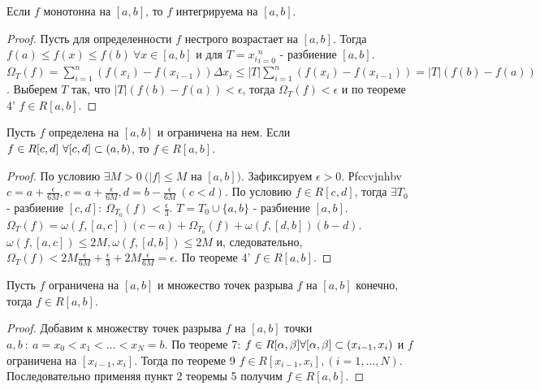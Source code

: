 \begin{theorem}
    Если $f$ монотонна на $[a, b]$, то $f$ интегрируема на $[a, b]$.
\end{theorem}

\begin{proof}
    Пусть для определенности $f$ нестрого возрастает на $[a, b]$. Тогда $f(a) \leq f(x) \leq f(b) \ \forall x \in [a, b]$ и для $T = {x_i}_{i = 0}^n$ - разбиение $[a, b]$.
    $\Omega_T (f) = \sum_{i = 1}^n(f(x_i) - f(x_{i-1}))\Delta x_i \leq |T|\sum_{i = 1}^n(f(x_i) - f(x_{i-1}))
    = |T|(f(b) - f(a))$.
    Выберем $T$ так, что $|T| (f(b) - f(a)) < \epsilon$, тогда $\Omega_T(f) < \epsilon$ и по теореме 4'
    $f \in R[a, b]$.
\end{proof}

\begin{theorem}
    Пусть $f$ определена на $[a, b]$ и ограничена на нем.
    Если $f \in R[c, d] \ \forall [c, d] \sub (a, b)$, то $f \in R[a, b]$.
\end{theorem}

\begin{proof}
    По условию $\exists M > 0 \ (|f| \leq M $ на $[a, b])$.
    Зафиксируем $\epsilon > 0$. Рfccvjnhbv $c = a + \frac{\epsilon}{6M},
    c = a + \frac{\epsilon}{6M}, d = b - \frac{\epsilon}{6M} \ (c < d)$.
    По условию $f \in R[c, d]$, тогда $\exists T_0$ - разбиение
    $[c, d] : \ \Omega_{T_0}(f) < \frac{\epsilon}{3}$.
    $T = T_0 \cup \{a, b\}$ - разбиение $[a, b]$.
    $\Omega_T(f) = \omega(f, [a, c])(c - a) + \Omega_{T_0}(f) + \omega(f, [d, b])(b - d)$.
    $\omega(f, [a, c]) \leq 2M, \omega(f, [d, b]) \leq 2M$ и, следовательно,
    $\Omega_T(f) < 2M \frac{\epsilon}{6M} + \frac{\epsilon}{3} + 2M \frac{\epsilon}{6M} = \epsilon$.
    По теореме 4' $f \in R[a, b]$.
\end{proof}

\begin{corollary}
    Пусть $f$ ограничена на $[a, b]$ и множество точек разрыва $f$ на $[a, b]$ конечно,
    тогда $f \in R[a, b]$.
\end{corollary}

\begin{proof}
    Добавим к множеству точек разрыва $f$ на $[a, b]$ точки
    $a, b \ : \ a = x_0 < x_1 < \dots < x_N = b$.
    По теореме 7: $f \in R[\alpha, \beta] \forall [\alpha, \beta] \subset (x_{i-1}, x_i)$
    и $f$ ограничена на $[x_{i-1}, x_{i}]$. Тогда по теореме 9 $f \in R[x_{i-1}, x_{i}],
    (i = 1, \dots, N)$. Последовательно применяя пункт 2 теоремы 5 получим $f \in R[a, b]$.
\end{proof}


